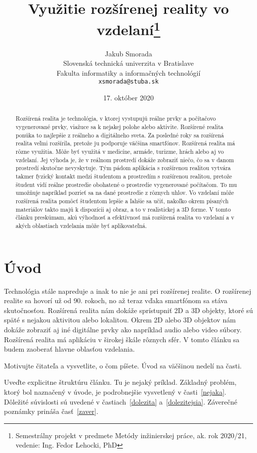 \documentclass[10pt,twoside,slovak,a4paper]{article}
\title{Využitie rozšírenej reality vo vzdelaní\thanks{Semestrálny projekt v predmete Metódy inžinierskej práce, ak. rok 2020/21, vedenie: Ing. Fedor Lehocki, PhD}}
\author{Jakub Smorada\\[2pt]
	{\small Slovenská technická univerzita v Bratislave}\\
	{\small Fakulta informatiky a informačných technológií}\\
	{\small \texttt{xsmorada@stuba.sk}}
	}
\date{\small 17. október 2020}
\begin{document}
\maketitle

\begin{abstract}
Rozšírená realita je technológia, v ktorej vystupujú reálne prvky a počítačovo vygenerované prvky, viažuce sa k nejakej polohe alebo aktivite. Rozšírené realita ponúka to najlepšie z reálneho a digitálneho sveta. Za posledné roky sa rozšírená realita veľmi rozšírila, pretože ju podporuje väčšina smartfónov. Rozšírená realita má rôzne využitia. Môže byť využitá v medicíne, armáde, turizme, hrách alebo aj vo vzdelaní. Jej výhoda je, že v reálnom prostredí dokáže zobraziť niečo, čo sa v danom prostredí skutočne nevyskytuje. Tým pádom aplikácia s rozšírenou realitou vytvára takmer fyzický kontakt medzi študentom a prostredím s rozšírenou realitou, pretože študent vidí reálne prostredie obohatené o prostredie vygenerované počítačom. To mu umožňuje napríklad pozrieť sa na dané prostredie z rôznych uhlov. Vo vzdelaní môže rozšírená realita pomôcť študentom lepšie a ľahšie sa učiť, nakoľko okrem písaných materiálov takto majú k dispozícii aj obraz, a to v realistickej a 3D forme. V tomto článku preskúmam, akú výhodnosť a efektívnosť má rozšírená realita vo vzdelaní a v akých oblastiach vzdelania môže byť aplikovateľná.
\end{abstract}

\section{Úvod}
Technológia stále napreduje a inak to nie je ani pri rozšírenej realite.  O rozšírenej realite sa hovorí už od 90. rokoch, no až teraz vďaka smartfónom sa stáva skutočnosťou. Rozšírená realita nám dokáže sprístupniť 2D a 3D objekty, ktoré sú späté s nejakou aktivitou alebo lokalitou. Okrem 2D alebo 3D objektov nám dokáže zobraziť aj iné digitálne prvky ako napríklad audio alebo video súbory. Rozšírená realita má aplikáciu v širokej škále rôznych sfér. V tomto článku sa budem zaoberať hlavne oblasťou vzdelania. 

Motivujte čitateľa a vysvetlite, o čom píšete. Úvod sa väčšinou nedelí na časti.

Uveďte explicitne štruktúru článku. Tu je nejaký príklad.
Základný problém, ktorý bol naznačený v úvode, je podrobnejšie vysvetlený v časti~\ref{nejaka}.
Dôležité súvislosti sú uvedené v častiach~\ref{dolezita} a~\ref{dolezitejsia}.
Záverečné poznámky prináša časť~\ref{zaver}.
\end{document}
